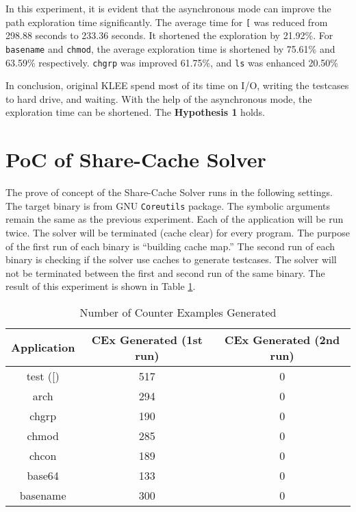 In this experiment, it is evident that the asynchronous mode can improve the path exploration time significantly. The average time for \texttt{[} was reduced from 298.88 seconds to 233.36 seconds. It shortened the exploration by 21.92\%. For \texttt{basename} and \texttt{chmod}, the average exploration time is shortened by 75.61\% and 63.59\% respectively. \texttt{chgrp} was improved 61.75\%, and \texttt{ls} was enhanced 20.50\%

In conclusion, original KLEE spend most of its time on I/O, writing the testcases to hard drive, and waiting. With the help of the asynchronous mode, the exploration time can be shortened. The \textbf{Hypothesis 1} holds.

\section{PoC of Share-Cache Solver}

The prove of concept of the Share-Cache Solver runs in the following settings. The target binary is from GNU \texttt{Coreutils} package. The symbolic arguments remain the same as the previous experiment. Each of the application will be run twice. The solver will be terminated (cache clear) for every program. The purpose of the first run of each binary is ``building cache map.'' The second run of each binary is checking if the solver use caches to generate testcases. The solver will not be terminated between the first and second run of the same binary. The result of this experiment is shown in Table \ref{poc_table}.

\begin{table}[ht]
\centering
\begin{tabular}{|c|c|c|} 
\hline
Application & CEx Generated (1st run) & CEx Generated (2nd run)  \\ 
\hline
test ([)           & 517        & 0                                     \\ 
\hline
arch        & 294        & 0                                     \\ 
\hline
chgrp       & 190        & 0                                     \\ 
\hline
chmod       & 285        & 0                                     \\ 
\hline
chcon       & 189        & 0                                     \\ 
\hline
base64      & 133        & 0                                     \\ 
\hline
basename    & 300        & 0                                     \\
\hline
\end{tabular}
\caption{Number of Counter Examples Generated}
\label{poc_table}
\end{table}

